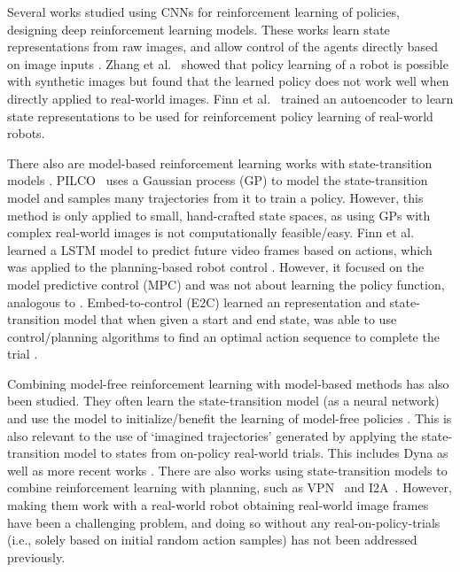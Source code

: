 \documentclass[letterpaper, 10 pt, conference]{ieeeconf}
\begin{document}
Several works studied using CNNs for reinforcement learning of policies, designing deep reinforcement learning models. These works learn state representations from raw images, and allow control of the agents directly based on image inputs \cite{mnih2013playing,koutnik2014online,heess2015learning,zhang2015towards,finn2016auto}.
Zhang et al.~\cite{zhang2015towards} showed that policy learning of a robot is possible with synthetic images but found that the learned policy does not work well when directly applied to real-world images. Finn et al.~\cite{finn2016auto} trained an autoencoder to learn state representations to be used for reinforcement policy learning of real-world robots.


There also are model-based reinforcement learning works with state-transition models \cite{watter2015embed,lenz2015deepmpc,finn2017deep}.
PILCO~\cite{deisenroth2011pilco,mcallister2017data} uses a Gaussian process (GP) to model the state-transition model and samples many trajectories from it to train a policy. However, this method is only applied to small, hand-crafted state spaces, as using GPs with complex real-world images is not computationally feasible/easy. Finn et al.~\cite{finn2016unsupervised} learned a LSTM model to predict future video frames based on actions, which was applied to the planning-based robot control \cite{finn2017deep}. However, it focused on the model predictive control (MPC) and was not about learning the policy function, analogous to \cite{wahlstrom2015pixels}. Embed-to-control (E2C) learned an representation and state-transition model that when given a start and end state, was able to use control/planning algorithms to find an optimal action sequence to complete the trial \cite{watter2015embed}.

Combining model-free reinforcement learning with model-based methods has also been studied. They often learn the state-transition model (as a neural network) and use the model to initialize/benefit the learning of model-free policies \cite{nagabandi2017neural,pong2018temporal}. This is also relevant to the use of `imagined trajectories' generated by applying the state-transition model to states from on-policy real-world trials. This includes Dyna \cite{sutton1990integrated} as well as more recent works \cite{gu2016continuous,venkatraman2016improved,silver2016predictron}. There are also works using state-transition models to combine reinforcement learning with planning, such as VPN~\cite{oh2017value} and I2A~\cite{weber2017imagination}. However, making them work with a real-world robot obtaining real-world image frames have been a challenging problem, and doing so without any real-on-policy-trials (i.e., solely based on initial random action samples) has not been addressed previously.
\end{document}
